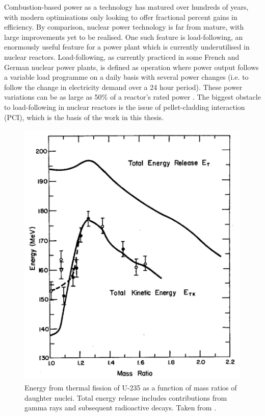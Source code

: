 Combustion-based power as a technology has matured over hundreds of years, with modern optimisations only looking to offer fractional percent gains in efficiency. By comparison, nuclear power technology is far from mature, with large improvements yet to be realised. One such feature is load-following, an enormously useful feature for a power plant which is currently underutilised in nuclear reactors. Load-following, as currently practiced in some French and German nuclear power plants, is defined as operation where power output follows a variable load programme on a daily basis with several power changes (i.e. to follow the change in electricity demand over a 24 hour period). These power variations can be as large as 50\% of a reactor's rated power \cite{lokhov2011technical}. The biggest obstacle to load-following in nuclear reactors is the issue of pellet-cladding interaction (PCI), which is the basis of the work in this thesis.

\begin{figure}[ht]
\centering
\includegraphics[height=13cm]{images/fission_energy_total.png}
\caption[Energy from thermal fission of U-235 as a function of mass ratios of daughter nuclei. Total energy release includes contributions from gamma rays and subsequent radioactive decays.]{Energy from thermal fission of U-235 as a function of mass ratios of daughter nuclei. Total energy release includes contributions from gamma rays and subsequent radioactive decays. Taken from \cite{aras1965ranges}.}
\label{figure:fissionenergy}
\end{figure}

